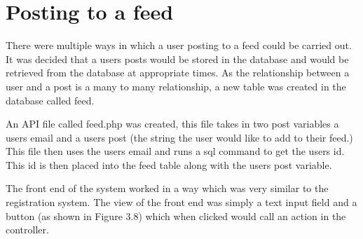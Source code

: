 \section{Posting to a feed}
There were multiple ways in which a user posting to a feed could be carried out. It was decided that a users posts would be stored in the database and would be retrieved from the database at appropriate times. As the relationship between a user and a post is a many to many relationship, a new table was created in the database called feed. 

An API file called feed.php was created, this file takes in two post variables a users email and a users post (the string the user would like to add to their feed.) This file then uses the users email and runs a sql command to get the users id. This id is then placed into the feed table along with the users post variable.

The front end of the system worked in a way which was very similar to the registration system. The view of the front end was simply a text input field and a button (as shown in Figure 3.8) which when clicked would call an action in the controller.

